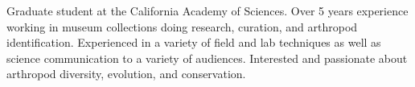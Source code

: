

\begin{cvparagraph}

Graduate student at the California Academy of Sciences. Over 5 years experience working in museum collections doing research, curation, and arthropod identification. Experienced in a variety of field and lab techniques as well as science communication to a variety of audiences. Interested and passionate about arthropod diversity, evolution, and conservation.
\end{cvparagraph}
